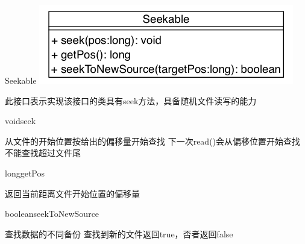 \begin{XeClass}{Seekable}
\includegraphics[width=\textwidth]{cdig/Seekable.png}
     
 此接口表示实现该接口的类具有seek方法，具备随机文件读写的能力

    \begin{XeMethod}{}{void}{seek}
         
 从文件的开始位置按给出的偏移量开始查找
 下一次read()会从偏移位置开始查找
 不能查找超过文件尾

    \end{XeMethod}

    \begin{XeMethod}{}{long}{getPos}
         
 返回当前距离文件开始位置的偏移量

    \end{XeMethod}

    \begin{XeMethod}{}{boolean}{seekToNewSource}
         
 查找数据的不同备份
 查找到新的文件返回true，否者返回false

    \end{XeMethod}

\end{XeClass}
